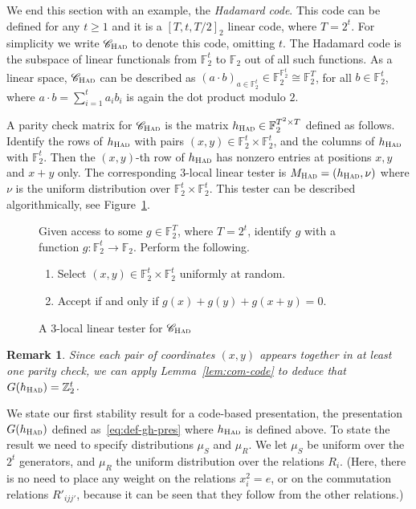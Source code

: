 \documentclass[11pt]{article}
\newtheorem{remark}[theorem]{Remark}
\theoremstyle{definition}
\newcommand{\code}{\mathscr{C}}
\newcommand{\field}{\mathbb{F}_2}
\newcommand{\F}{\ensuremath{\mathbb{F}}}
\newcommand{\Z}{\ensuremath{\mathbb{Z}}}
\newcommand{\had}{\textsc{Had}}
\newenvironment{gamespec}{
  \begin{mdframed}[style=figstyle]}{
  \end{mdframed}}
\begin{document}
We end this section with an example, the \emph{Hadamard code}. This code can be defined for any  $t\geq 1$ and it is a $[T,t,T/2]_2$ linear code, where $T=2^t$. For simplicity we write  $\code_\had$ to denote this code, omitting $t$. The Hadamard code is the subspace of linear functionals from $\field^t$ to $\field$ out of all such functions. As a linear space, $\code_\had$ can be described as  $(a\cdot b)_{a\in \field^t} \in \field^{\field^t}\cong \field^T$, for all $b\in \field^t$, where $ a\cdot b=\sum_{i=1}^t a_ib_i$ is again the dot product modulo $2$.  

A parity check matrix for $\code_\had$ is the matrix $h_\had\in \F_2^{T^2\times T}$ defined as follows. Identify the rows of $h_\had$ with pairs $(x,y)\in \F_2^t\times \F_2^t$, and the columns of $h_\had$ with $\F_2^t$. Then the $(x,y)$-th row of $h_\had$ has nonzero entries at positions $x,y$ and $x+y$ only. 
The corresponding $3$-local linear tester is $M_\had = (h_\had,\nu)$ where $\nu$ is the uniform distribution over $\F_2^t \times \F_2^t$. This tester can be described algorithmically, see Figure~\ref{fig:test-had}. 

\begin{figure}[!htbp]
  \centering
  \begin{gamespec}
	Given access to some $g\in \F_2^T$, where $T=2^t$, identify $g$ with a function $g:\F_2^t\to\F_2$. Perform the following. 
\begin{enumerate}
\item Select $(x,y)\in \F_2^t \times \F_2^t$ uniformly at random. 
\item Accept if and only if $g(x)+g(y)+g(x+y)=0$.  	
    \end{enumerate}
  \end{gamespec}
  \caption{A $3$-local linear tester for $\code_{\had}$}
  \label{fig:test-had}
\end{figure}

\begin{remark}
Since each pair of coordinates $(x,y)$ appears together in at least one parity check, we can apply Lemma~\ref{lem:com-code} to deduce that $G(h_\had)=\Z_2^t$. 
\end{remark}

We state our first stability result for a code-based presentation, the presentation $G(h_\had)$ defined as~\eqref{eq:def-gh-pres} where $h_\had$ is defined above. To state the result we need to specify distributions $\mu_S$ and $\mu_R$. We let $\mu_S$ be uniform over the $2^t$ generators, and $\mu_R$ the uniform distribution over the relations $R_{i}$. (Here, there is no need to place any weight on the relations $x_i^2=e$, or on the commutation relations $R'_{ijj'}$, because it can be seen that they follow from the other relations.)  
\end{document}
